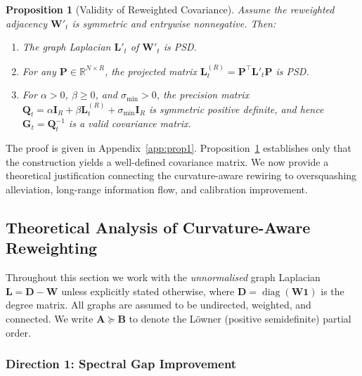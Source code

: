 \documentclass{article}
\theoremstyle{plain}
\newtheorem{proposition}[theorem]{Proposition}
\theoremstyle{definition}
\theoremstyle{remark}
\newcommand{\R}{\mathbb{R}}
\newcommand{\diag}{\operatorname{diag}}
\begin{document}
\begin{proposition}[Validity of Reweighted Covariance]
\label{prop:validity}
Assume the reweighted adjacency $\mathbf{W}'_t$ is symmetric and entrywise
nonnegative. Then:
\begin{enumerate}
  \item[(i)] The graph Laplacian $\mathbf{L}'_t$ of $\mathbf{W}'_t$ is PSD.
  \item[(ii)] For any $\mathbf{P} \in \R^{N \times R}$, the projected matrix
    $\mathbf{L}_t^{(R)} = \mathbf{P}^\top \mathbf{L}'_t \mathbf{P}$ is PSD.
  \item[(iii)] For $\alpha > 0$, $\beta \ge 0$, and $\sigma_{\min} > 0$, the
    precision matrix $\mathbf{Q}_t = \alpha\mathbf{I}_R
    + \beta\mathbf{L}_t^{(R)} + \sigma_{\min}\mathbf{I}_R$ is symmetric
    positive definite, and hence $\mathbf{G}_t = \mathbf{Q}_t^{-1}$ is a
    valid covariance matrix.
\end{enumerate}
\end{proposition}

The proof is given in Appendix~\ref{app:prop1}.  Proposition~\ref{prop:validity}
establishes only that the construction yields a well-defined covariance matrix. We now provide a theoretical justification connecting the curvature-aware rewiring to oversquashing alleviation, long-range
information flow, and calibration improvement.

\subsection{Theoretical Analysis of Curvature-Aware Reweighting}
\label{ssec:theory}

Throughout this section we work with the \emph{unnormalised} graph Laplacian
$\mathbf{L} = \mathbf{D} - \mathbf{W}$ unless explicitly stated otherwise,
where $\mathbf{D} = \diag(\mathbf{W}\mathbf{1})$ is the degree matrix.  All
graphs are assumed to be undirected, weighted, and connected.  We write
$\mathbf{A} \succeq \mathbf{B}$ to denote the L\"{o}wner (positive
semidefinite) partial order.

\subsubsection{Direction 1: Spectral Gap Improvement}
\label{sssec:spectral-gap}
\end{document}
